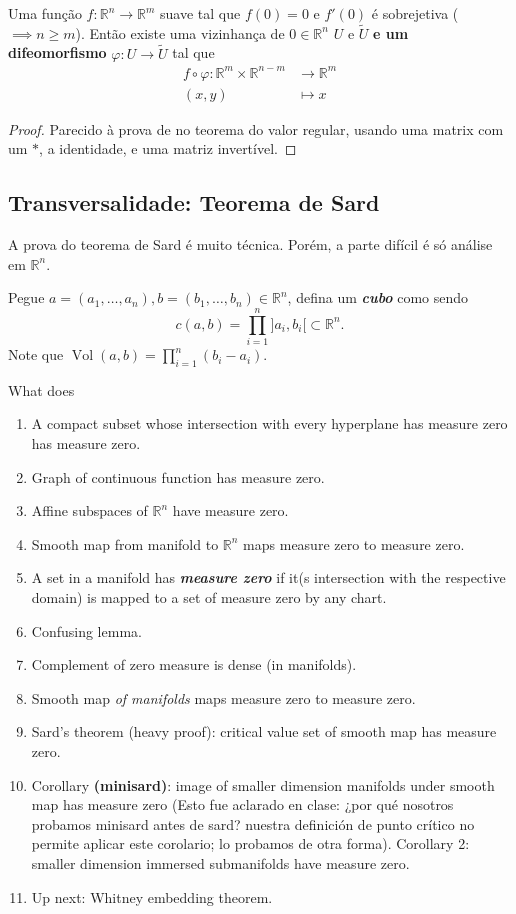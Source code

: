 Uma função \(f:\mathbb{R}^n \to \mathbb{R}^m\) suave tal que \(f(0)=0\) e  \(f'(0)\) é sobrejetiva (\(\implies n \geq m\)). Então existe uma vizinhança de \(0 \in \mathbb{R}^n\) \(U\) e \(\tilde{U}\) \textbf{e um difeomorfismo} \(\varphi: U \to \tilde{U}\) tal que
\begin{align*}
	f \circ \varphi: \mathbb{R}^m \times \mathbb{R}^{n-m} &\longrightarrow \mathbb{R}^m \\
	(x,y) &\longmapsto x
\end{align*}

\begin{proof}\leavevmode
Parecido à prova de \cite{tus} no teorema do valor regular, usando uma matrix com um \(*\), a identidade, e uma matriz invertível.
\end{proof}

\subsection{Transversalidade: Teorema de Sard}

A prova do teorema de Sard é muito técnica. Porém, a parte difícil é só análise em \(\mathbb{R}^n\).

Pegue \(a=(a_1,\ldots,a_n),b=(b_1,\ldots,b_n) \in \mathbb{R}^n\), defina um \textit{\textbf{cubo}} como sendo
\[c(a,b)=\prod_{i=1}^n ]a_i,b_i[ \subset \mathbb{R}^n.\]
Note que \(\operatorname{Vol}(a,b)=\prod_{i=1}^n(b_i-a_i).\)

\begin{thing5}{What \cite{lee} does}\leavevmode
\begin{enumerate}
\item A compact subset whose intersection with every hyperplane has measure zero has measure zero.
\item Graph of continuous function has measure zero.
\item Affine subspaces of \(\mathbb{R}^n\) have measure zero.
\item Smooth map from manifold to \(\mathbb{R}^n\) maps measure zero to measure zero.
\item A set in a manifold has \textit{\textbf{measure zero}} if it(s intersection with the respective domain) is mapped to a set of measure zero by any chart.
\item Confusing lemma.
\item Complement of zero measure is dense (in manifolds).
\item Smooth map \textit{of manifolds} maps measure zero to measure zero.
\item Sard's theorem (heavy proof): critical value set of smooth map has measure zero.
\item Corollary \textbf{(minisard)}: image of smaller dimension manifolds under smooth map has measure zero {\color{6}(Esto fue aclarado en clase: ¿por qué nosotros probamos minisard antes de sard? nuestra definición de punto crítico no permite aplicar este corolario; lo probamos de otra forma)}. Corollary 2: smaller dimension immersed submanifolds have measure zero.
\item Up next: Whitney embedding theorem.
\end{enumerate}
\end{thing5}

